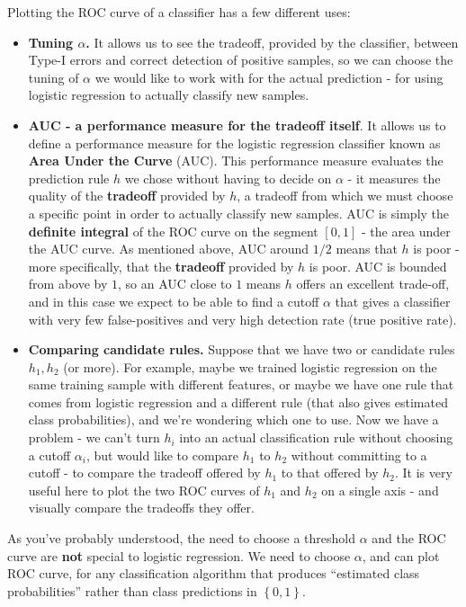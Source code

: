 \documentclass[11pt]{article}
\begin{document}
	Plotting the ROC curve of a classifier has a few different uses:
	\begin{itemize}
	  \item {\bf Tuning $\alpha$.} It allows us to see the tradeoff, provided by the classifier,
	    between Type-I errors and correct detection of positive samples, so
	    we can choose the tuning of $\alpha$ we would like to work with for
	    the actual prediction - for using logistic regression  to actually
	    classify new samples.
	  \item {\bf AUC - a performance measure for the tradeoff itself}. 
	    It allows us to define a performance measure for the logistic
	    regression classifier known as {\bf Area Under the Curve} (AUC).
	    This performance measure evaluates the prediction rule $h$ we chose
	    without having to decide on $\alpha$ - it measures the quality of
	    the {\bf tradeoff} provided by $h$, a tradeoff from which we must
	    choose a specific point in order to actually classify new samples.
	    AUC is simply the {\bf definite integral} of the ROC curve on 
	    the segment $[0,1]$ - the area under the AUC curve. As mentioned
	    above, AUC around $1/2$ means that $h$ is poor - more specifically,
	    that the {\bf tradeoff} provided by $h$ is poor. AUC is bounded from above by $1$,
	    so an AUC close to $1$ means $h$ offers an excellent trade-off, and
	    in this case
	    we expect to be able to find a cutoff $\alpha$ that gives a
	    classifier with very few false-positives and very high detection
	    rate (true positive rate).
	  \item {\bf Comparing candidate rules.} Suppose that we have two or
	    candidate rules $h_1,h_2$ (or more). For example, maybe we trained
	    logistic regression on the same training sample with different
	    features, or maybe we have one rule that comes from logistic
	    regression and a different rule (that also gives estimated class
	    probabilities), and we're wondering which one to use. Now we have a
	    problem - we can't turn $h_i$ into an actual classification rule
	    without choosing a cutoff $\alpha_i$, but would like to compare
	    $h_1$ to $h_2$ without committing to a cutoff - to compare the
	    tradeoff offered by $h_1$ to that offered by $h_2$. It is very
	    useful here to plot the two ROC curves of $h_1$ and $h_2$ on a
	    single axis - and visually compare the tradeoffs they offer. 
	\end{itemize}



	As you've probably understood, the need to choose a threshold $\alpha$
	and the ROC curve are {\bf not} special to
	logistic regression. We need to choose $\alpha$, and can plot ROC curve,
	for any classification algorithm that produces ``estimated class
	probabilities'' rather than class predictions in $\left\{ 0,1
	\right\}$.
\end{document}
